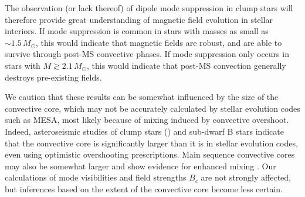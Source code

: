 The observation (or lack thereof) of dipole mode suppression in clump stars will therefore provide great understanding of magnetic field evolution in stellar interiors. If mode suppression is common in stars with masses as small as $\sim \! 1.5 \, M_\odot$, this would indicate that magnetic fields are robust, and are able to survive through post-MS convective phases. If mode suppression only occurs in stars with $M \gtrsim 2.1 \, M_\odot$, this would indicate that post-MS convection generally destroys pre-existing fields. 

We caution that these results can be somewhat influenced by the size of the convective core, which may not be accurately calculated by stellar evolution codes such as MESA, most likely because of mixing induced by convective overshoot. Indeed, asteroseismic studies of clump stars (\cite{montalban_2013,stello_2013,mosser_2014,bossini_2015,constantino_2015}) and sub-dwarf B stars \citep{vangrootel_2010a,vangrootel_2010b,charpinet_2011,Schindler_2015} indicate that the convective core is significantly larger than it is in stellar evolution codes, even using optimistic overshooting prescriptions. Main sequence convective cores may also be somewhat larger and show evidence for enhanced mixing \citep{moravveji_2015}.  Our calculations of mode visibilities and field strengths $B_c$ are not strongly affected, but inferences based on the extent of the convective core become less certain.
    
    
